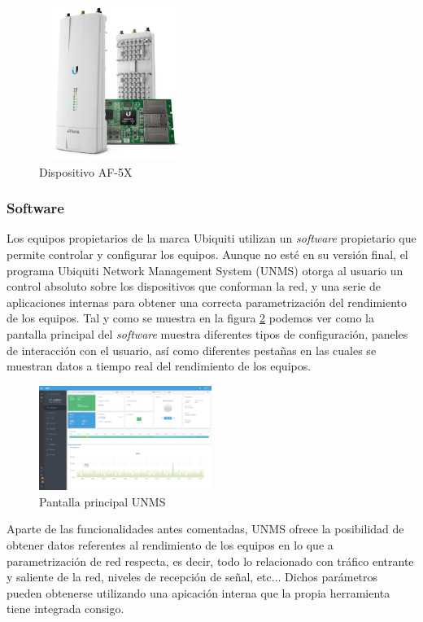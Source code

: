 \begin{figure}[H]
		\centering
		\includegraphics[width=5cm,height=5cm]{img/af_5x.JPG}
		\caption{Dispositivo AF-5X}
		\label{af_5x}
	\end{figure}
	
\subsubsection{Software}
Los equipos propietarios de la marca Ubiquiti utilizan un \textit{software} propietario que permite controlar y configurar los equipos. Aunque no esté en su versión final, el programa Ubiquiti Network Management System (UNMS) otorga al usuario un control absoluto sobre los dispositivos que conforman la red, y una serie de aplicaciones internas para obtener una correcta parametrización del rendimiento de los equipos. Tal y como se muestra en la figura \ref{unms} podemos ver como la pantalla principal del \textit{software} muestra diferentes tipos de configuración, paneles de interacción con el usuario, así como diferentes pestañas en las cuales se muestran datos a tiempo real del rendimiento de los equipos. 

\begin{figure}[H]
		\centering
		\includegraphics[width=0.5\textwidth]{img/unms.png}
		\caption{Pantalla principal UNMS}
		\label{unms}
	\end{figure}
	
Aparte de las funcionalidades antes comentadas, UNMS ofrece la posibilidad de obtener datos referentes al rendimiento de los equipos en lo que a parametrización de red respecta, es decir, todo lo relacionado con tráfico entrante y saliente de la red, niveles de recepción de señal, etc... Dichos parámetros pueden obtenerse utilizando una apicación interna que la propia herramienta tiene integrada consigo.

